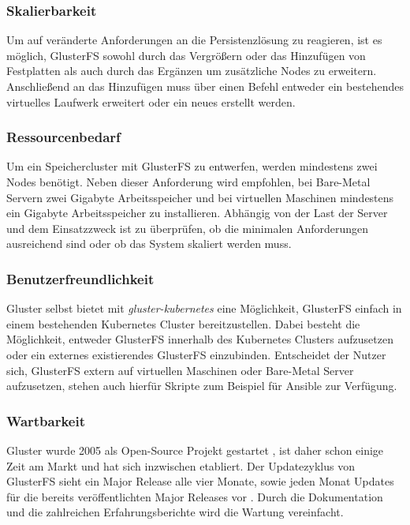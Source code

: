 \subsubsection{Skalierbarkeit}
Um auf veränderte Anforderungen an die Persistenzlösung zu reagieren, ist es möglich, GlusterFS sowohl durch das Vergrößern oder das Hinzufügen von Festplatten als auch durch das Ergänzen um zusätzliche Nodes zu erweitern. Anschließend an das Hinzufügen muss über einen Befehl entweder ein bestehendes virtuelles Laufwerk erweitert oder ein neues erstellt werden.

\subsubsection{Ressourcenbedarf}
Um ein Speichercluster mit GlusterFS zu entwerfen, werden mindestens zwei Nodes benötigt. Neben dieser Anforderung wird empfohlen, bei Bare-Metal Servern zwei Gigabyte Arbeitsspeicher \cite{gluster:bm} und bei virtuellen Maschinen mindestens ein Gigabyte Arbeitsspeicher \cite{gluster:vm} zu installieren. Abhängig von der Last der Server und dem Einsatzzweck ist zu überprüfen, ob die minimalen Anforderungen ausreichend sind oder ob das System skaliert werden muss.

\subsubsection{Benutzerfreundlichkeit}
Gluster selbst bietet mit \textit{gluster-kubernetes} eine Möglichkeit, GlusterFS einfach in einem bestehenden Kubernetes Cluster bereitzustellen. Dabei besteht die Möglichkeit, entweder GlusterFS innerhalb des Kubernetes Clusters aufzusetzen oder ein externes existierendes GlusterFS einzubinden. Entscheidet der Nutzer sich, GlusterFS extern auf virtuellen Maschinen oder Bare-Metal Server aufzusetzen, stehen auch hierfür Skripte zum Beispiel für Ansible zur Verfügung.

\subsubsection{Wartbarkeit}
Gluster wurde 2005 als Open-Source Projekt gestartet \cite{XiaoD.ZhangC.Li2015TheStorage}, ist daher schon einige Zeit am Markt und hat sich inzwischen etabliert. Der Updatezyklus von GlusterFS sieht ein Major Release alle vier Monate, sowie jeden Monat Updates für die bereits veröffentlichten Major Releases vor \cite{gluster:release}. Durch die Dokumentation und die zahlreichen Erfahrungsberichte wird die Wartung vereinfacht.

